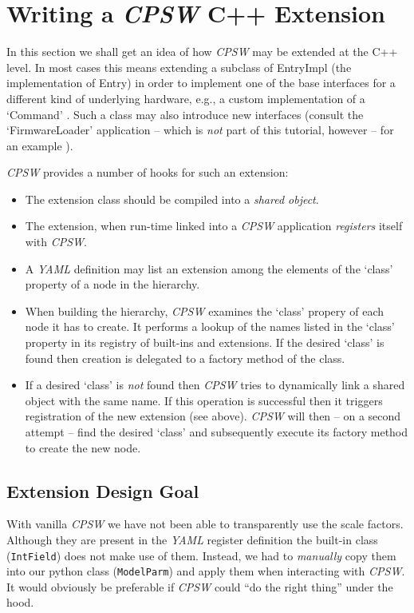 \documentclass[10pt]{article}
\newcommand{\ita}[1]{\emph{#1}}
\newcommand{\cpsw}      {\ita {CPSW}}
\newcommand{\yaml}      {\ita {YAML}}
\newcommand{\entry}     {{Entry}}
\newcommand{\entryimpl} {{EntryImpl}}
\newcommand{\py}        {python}
\newcommand{\cpp}       {C++}
\newcommand{\cod}[1] {{\tt#1}}
\begin{document}
\section{Writing a \cpsw{} \cpp{} Extension}
In this section we shall get an idea of how \cpsw{} may be extended at the \cpp{} level.
In most cases this means extending a subclass of \entryimpl{} (the implementation of \entry{})
in order to implement one of the base interfaces for a different kind of underlying
hardware, e.g., a custom implementation of a `Command' \cite{myCommand}.
Such a class may also introduce new interfaces (consult the `FirmwareLoader' application
-- which is {\em not} part of this tutorial, however -- for an example \cite{FWLoader}).

\cpsw{} provides a number of hooks for such an extension:
\begin{itemize}
\item The extension class should be compiled into a {\em shared object}.
\item The extension, when run-time linked into a \cpsw{} application {\em registers}
      itself with \cpsw{}.
\item A \yaml{} definition may list an extension among the elements of the `class'
      property of a node in the hierarchy.
\item When building the hierarchy, \cpsw{} examines the `class' propery of each node
      it has to create. It performs a lookup of the names listed in the `class' property
      in its registry of built-ins and extensions. If the desired `class' is found
      then creation is delegated to a factory method of the class.
\item If a desired `class' is {\em not} found then \cpsw{} tries to dynamically
      link a shared object with the same name. If this operation is successful then
      it triggers registration of the new extension (see above). \cpsw{} will then -- on 
      a second attempt -- find the desired `class' and subsequently execute its
      factory method to create the new node.
\end{itemize}

\subsection{Extension Design Goal}
With vanilla \cpsw{} we have not been able to transparently use the scale factors.
Although they are present in the \yaml{} register definition the built-in class
(\cod{IntField}) does not make use of them. Instead, we had to {\em manually}
copy them into our \py{} class (\cod{\mbox{ModelParm}}) and apply them when
interacting with \cpsw{}. It would obviously be preferable if \cpsw{} could ``do
the right thing'' under the hood.
\end{document}
